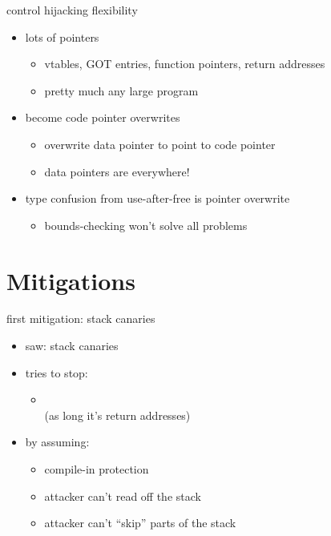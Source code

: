 \begin{frame}{control hijacking flexibility}
    \begin{itemize}
        \item lots of  pointers 
        \begin{itemize}
            \item vtables, GOT entries, function pointers, return addresses
            \item pretty much any large program
        \end{itemize}
    \item {} become code pointer overwrites
        \begin{itemize}
            \item overwrite data pointer to point to code pointer
            \item data pointers are everywhere!
        \end{itemize}
    \item type confusion from use-after-free is pointer overwrite
        \begin{itemize}
            \item bounds-checking won't solve all problems
        \end{itemize}
    \end{itemize}
\end{frame}

\section{Mitigations}

\begin{frame}{first mitigation: stack canaries}
    \begin{itemize}
    \item saw: stack canaries
    \item tries to stop:
        \begin{itemize}
        \item {} \\
             (as long it's return addresses)
        \end{itemize}
    \item by assuming:
        \begin{itemize}
        \item compile-in protection
        \item attacker can't read off the stack
        \item attacker can't ``skip'' parts of the stack
        \end{itemize}
    \end{itemize}
\end{frame}

